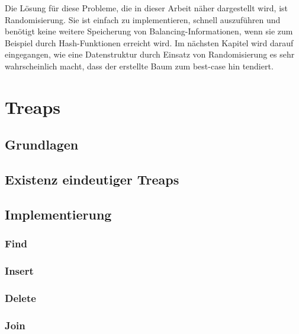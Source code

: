 \documentclass[a4paper]{scrreprt}
\theoremstyle{definition}
\begin{document}
Die Lösung für diese Probleme, die in dieser Arbeit näher dargestellt wird, ist Randomisierung.
Sie ist einfach zu implementieren, schnell auszuführen und benötigt keine weitere Speicherung von Balancing-Informationen, wenn sie zum Beispiel durch Hash-Funktionen erreicht wird.
Im nächsten Kapitel wird darauf eingegangen, wie eine Datenstruktur durch Einsatz von Randomisierung es sehr wahrscheinlich macht, dass der erstellte Baum zum best-case hin tendiert. 


\chapter{Treaps}
\label{sec:treaps}

\section{Grundlagen}
\label{sec:treapsbasics}

\section{Existenz eindeutiger Treaps}
\label{sec:uniquetreaps}

\section{Implementierung}
\label{sec:implementing}

\subsection{Find}
\label{sec:find}

\subsection{Insert}
\label{sec:insert}

\subsection{Delete}
\label{sec:delete}

\subsection{Join}
\label{sec:join}
\end{document}
